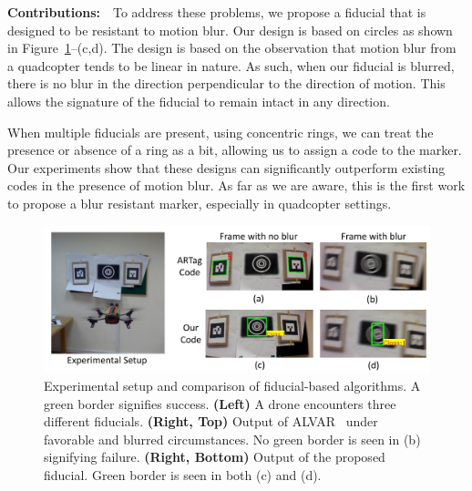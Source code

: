 \noindent\textbf{Contributions:}~~To address these problems, we propose a
fiducial that is designed to be resistant to motion blur. Our design
is based on circles as shown in Figure~\ref{fig:fiducial_teaser}--(c,d). The
design is based on the observation that motion blur from a quadcopter
tends to be linear in nature. As such, when our fiducial is blurred,
there is no blur in the direction perpendicular to the direction of
motion.  This allows the signature of the fiducial to remain intact in
any direction.

When multiple fiducials are present, using concentric rings, we can
treat the presence or absence of a ring as a bit, allowing us to
assign a code to the marker. Our experiments show that these designs can
significantly outperform existing codes in the presence of motion
blur. As far as we are aware, this is the first work to propose a blur
resistant marker, especially in quadcopter settings.


\begin{figure}[t!]
  \includegraphics[width=\linewidth]{figures/fiducial/teaser}
  \caption[Overview]{Experimental setup and comparison of fiducial-based
    algorithms. A green border signifies success. 
    \textbf{(Left)} A drone encounters three different fiducials. 
    \textbf{(Right, Top)} Output of ALVAR~\cite{alvar} under favorable and blurred
    circumstances. No green border is seen in (b) signifying failure.
    \textbf{(Right, Bottom)} Output of the proposed fiducial. Green
    border is seen in both (c) and (d).
    \label{fig:fiducial_teaser}}
  \end{figure}


